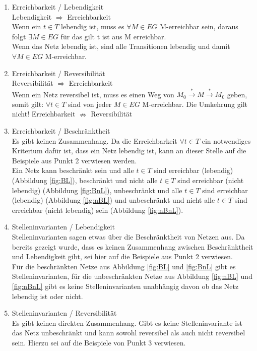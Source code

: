 \documentclass[10pt]{scrartcl}
\begin{document}
\begin{enumerate}
\item{Erreichbarkeit / Lebendigkeit}\\
Lebendigkeit $\Rightarrow$ Erreichbarkeit\\
Wenn ein $t \in T$ lebendig ist, muss es $\forall M \in EG$ M-erreichbar sein, daraus folgt $\exists M \in EG$ für das gilt t ist aus M erreichbar.\\
Wenn das Netz lebendig ist, sind alle Transitionen lebendig und damit $\forall M \in EG$ M-erreichbar.

\item{Erreichbarkeit / Reversibilität}\\
Reversibilität $\Rightarrow$ Erreichbarkeit\\
Wenn ein Netz reversibel ist, muss es einen Weg von $M_{0} \overset{*}{\rightarrow} M \overset{*}{\rightarrow} M_{0}$ geben, somit gilt: $\forall t \in T$ sind von jeder $M \in EG$ M-erreichbar.
Die Umkehrung gilt nicht! Erreichbarkeit $\nRightarrow$ Reversibilität

\item{Erreichbarkeit / Beschränktheit}\\
\label{erreichbarkeit_beschraenktheit}
Es gibt keinen Zusammenhang. Da die Erreichbarkeit $\forall t \in T$ ein notwendiges Kriterium dafür ist, dass ein Netz lebendig ist, kann an dieser Stelle auf die Beispiele aus Punkt 2 verwiesen werden.\\
Ein Netz kann beschränkt sein und alle $t \in T$ sind erreichbar (lebendig) (Abbildung \ref{fig:BL}), beschränkt und nicht alle $t \in T$ sind erreichbar (nicht lebendig) (Abbildung \ref{fig:BnL}), unbeschränkt und alle $t \in T$ sind erreichbar (lebendig) (Abbildung \ref{fig:nBL}) und unbeschränkt und nicht alle $t \in T$ sind erreichbar (nicht lebendig) sein (Abbildung \ref{fig:nBnL}).

\item{Stelleninvarianten / Lebendigkeit}\\
Stelleninvarianten sagen etwas über die Beschränktheit von Netzen aus. Da bereits gezeigt wurde, dass es keinen Zusammenhang zwischen Beschränktheit und Lebendigkeit gibt, sei hier auf die Beispiele aus Punkt 2 verwiesen.\\
Für die beschränkten Netze aus Abbildung \ref{fig:BL} und \ref{fig:BnL} gibt es Stelleninvarianten, für die unbeschränkten Netze aus Abbildung \ref{fig:nBL} und \ref{fig:nBnL} gibt es keine Stelleninvarianten unabhängig davon ob das Netz lebendig ist oder nicht.

\item{Stelleninvarianten / Reversibilität}\\
Es gibt keinen direkten Zusammenhang. Gibt es keine Stelleninvariante ist das Netz unbeschränkt und kann sowohl reversibel als auch nicht reversibel sein. Hierzu sei auf die Beispiele von Punkt 3 verwiesen.


\end{enumerate}
\end{document}
